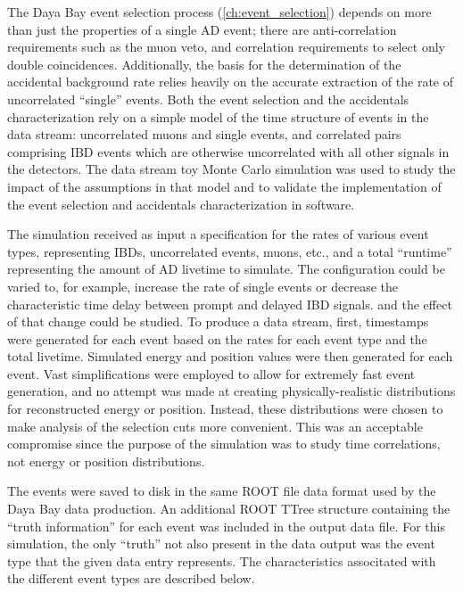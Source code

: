 The Daya Bay event selection process (\cref{ch:event_selection})
depends on more than just the properties of a single AD event;
there are anti-correlation requirements such as the muon veto,
and correlation requirements to select only double coincidences.
Additionally, the basis for the determination of the accidental background rate
relies heavily on the accurate extraction of
the rate of uncorrelated ``single'' events.
Both the event selection and the accidentals characterization
rely on a simple model of the time structure of events in the data stream:
uncorrelated muons and single events,
and correlated pairs comprising IBD events
which are otherwise uncorrelated with all other signals in the detectors.
The data stream toy Monte Carlo simulation was used
to study the impact of the assumptions in that model
and to validate the implementation of
the event selection and accidentals characterization
in software.

The simulation received as input
a specification for the rates of various event types,
representing IBDs, uncorrelated events, muons, etc.,
and a total ``runtime'' representing the amount of AD livetime to simulate.
The configuration could be varied to, for example,
increase the rate of single events
or decrease the characteristic time delay between prompt and delayed IBD signals.
and the effect of that change could be studied.
To produce a data stream,
first, timestamps were generated for each event
based on the rates for each event type and the total livetime.
Simulated energy and position values were then generated for each event.
Vast simplifications were employed to allow for
extremely fast event generation,
and no attempt was made at creating
physically-realistic distributions for
reconstructed energy or position.
Instead, these distributions were chosen to make analysis
of the selection cuts more convenient.
This was an acceptable compromise since the purpose of the simulation
was to study time correlations, not energy or position distributions.

The events were saved to disk in the same ROOT file data format
used by the Daya Bay data production.
An additional ROOT TTree structure containing the ``truth information''
for each event was included in the output data file.
For this simulation, the only ``truth'' not also present in the data output
was the event type that the given data entry represents.
The characteristics associtated with the different event types
are described below.

